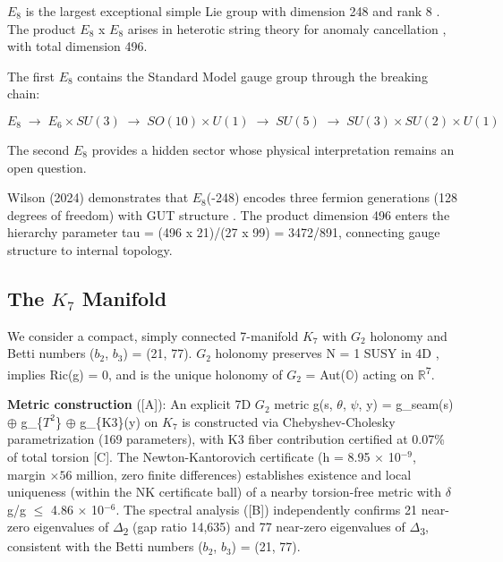 \documentclass[11pt,a4paper]{article}
\begin{document}
\(E_{8}\) is the largest exceptional simple Lie group with dimension 248
and rank 8 \cite{18}. The product \(E_{8}\) x \(E_{8}\) arises in
heterotic string theory for anomaly cancellation \cite{19}, with total
dimension 496.

The first \(E_{8}\) contains the Standard Model gauge group through the
breaking chain:

\[
E_8 \;\longrightarrow\; E_6 \times SU(3) \;\longrightarrow\; SO(10) \times U(1) \;\longrightarrow\; SU(5) \;\longrightarrow\; SU(3) \times SU(2) \times U(1)
\]

The second \(E_{8}\) provides a hidden sector whose physical
interpretation remains an open question.

Wilson (2024) demonstrates that \(E_{8}\)(-248) encodes three fermion
generations (128 degrees of freedom) with GUT structure \cite{9}. The
product dimension 496 enters the hierarchy parameter tau = (496 x
21)/(27 x 99) = 3472/891, connecting gauge structure to internal
topology.

\subsection{\texorpdfstring{The \(K_{7}\)
Manifold}{The K\_\{7\} Manifold}}\label{the-k_7-manifold}

We consider a compact, simply connected 7-manifold \(K_{7}\) with
\(G_{2}\) holonomy and Betti numbers (\(b_{2}\), \(b_{3}\)) = (21, 77).
\(G_{2}\) holonomy preserves N = 1 SUSY in 4D \cite{11}, implies Ric(g) =
0, and is the unique holonomy of \(G_{2}\) = Aut(\(\mathbb{O}\)) acting
on \(\mathbb{R}\)\textsuperscript{7}.

\textbf{Metric construction} ([A]): An explicit 7D
\(G_{2}\) metric g(s, \(\theta\), \(\psi\), y) = g\_seam(s) \(\oplus\)
g\_\{\(T^{2}\)\} \(\oplus\) g\_\{K3\}(y) on \(K_{7}\) is constructed via
Chebyshev-Cholesky parametrization (169 parameters), with K3 fiber
contribution certified at 0.07\% of total torsion [C]. The
Newton-Kantorovich certificate (h = 8.95 \(\times\) 10\(^{-9}\), margin
\(\times 56\) million, zero finite differences) establishes existence
and local uniqueness (within the NK certificate ball) of a nearby
torsion-free metric with \(\delta\)g/g \(\leq\) 4.86 \(\times\)
10\(^{-6}\). The spectral analysis ([B]) independently
confirms 21 near-zero eigenvalues of \(\Delta\)\textsubscript{2} (gap
ratio 14,635) and 77 near-zero eigenvalues of
\(\Delta\)\textsubscript{3}, consistent with the Betti numbers
(\(b_{2}\), \(b_{3}\)) = (21, 77).
\end{document}
